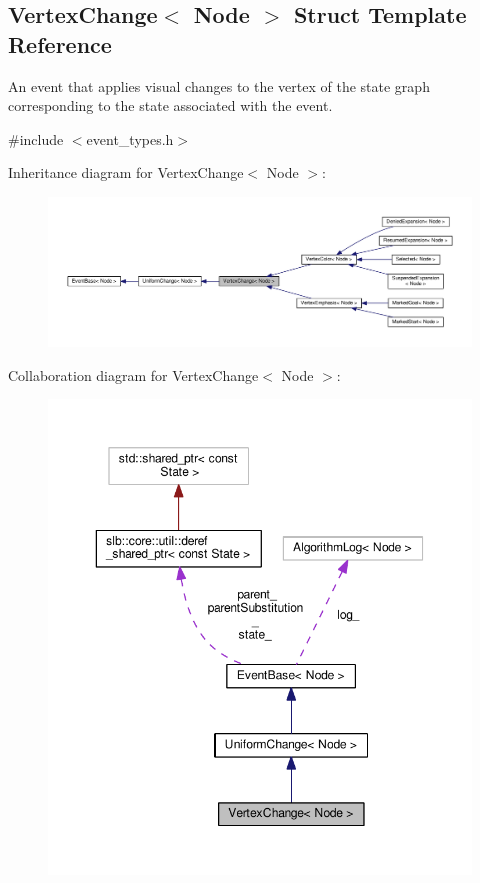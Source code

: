 \hypertarget{structVertexChange}{}\subsection{Vertex\+Change$<$ Node $>$ Struct Template Reference}
\label{structVertexChange}


An event that applies visual changes to the vertex of the state graph corresponding to the state associated with the event.  




{\ttfamily \#include $<$event\+\_\+types.\+h$>$}



Inheritance diagram for Vertex\+Change$<$ Node $>$\+:\nopagebreak
\begin{figure}[H]
\begin{center}
\leavevmode
\includegraphics[width=350pt]{structVertexChange__inherit__graph}
\end{center}
\end{figure}


Collaboration diagram for Vertex\+Change$<$ Node $>$\+:\nopagebreak
\begin{figure}[H]
\begin{center}
\leavevmode
\includegraphics[width=350pt]{structVertexChange__coll__graph}
\end{center}
\end{figure}
